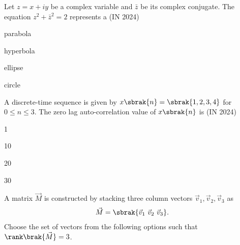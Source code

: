     \item Let $z = x + iy$ be a complex variable and $\bar{z}$ be its complex conjugate. The equation $z^2 + \bar{z}^2 = 2$ represents a
    \hfill{(IN 2024)}
    \begin{enumerate}
        \begin{multicols}{4}
            \item parabola
            \item hyperbola
            \item ellipse
            \item circle
        \end{multicols}
    \end{enumerate}
    \item A discrete-time sequence is given by $x\sbrak{n} = \sbrak{1,2,3,4}$ for $0 \leq n \leq 3$. The zero
    lag auto-correlation value of $x\sbrak{n}$ is
    \hfill{(IN 2024)}
    \begin{enumerate}
        \begin{multicols}{4}
            \item 1
            \item 10
            \item 20
            \item 30
        \end{multicols}
    \end{enumerate}
    \item A matrix $\vec{M}$ is constructed by stacking three column vectors $\vec{v}_1, \vec{v}_2, \vec{v}_3$ as
    \begin{align*}
        \vec{M} = \sbrak{\vec{v}_1 \ \vec{v}_2 \ \vec{v}_3}.
    \end{align*}
    Choose the set of vectors from the following options such that $\rank\brak{\vec{M}} = 3$.

